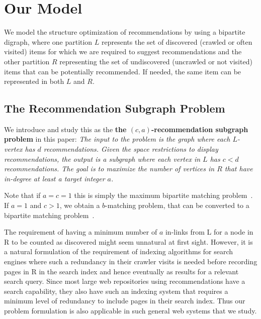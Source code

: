 \section{Our Model}

We model the structure optimization of recommendations by using a bipartite
digraph, where one partition $L$ represents the set of discovered (crawled or often visited) items for which
we are required to suggest recommendations and the other partition $R$
representing the set of undiscovered (uncrawled or not visited) items that can be potentially recommended. If
needed, the same item can be represented in both $L$ and $R$.
\vs

\subsection{The Recommendation Subgraph Problem}
We introduce and study this as the {\bf the $(c, a)$-recommendation subgraph problem} in this paper:
{\em
 The input to the problem is the graph where each
$L$-vertex has $d$ recommendations. Given the space restrictions to
display recommendations, the output is a subgraph where each vertex in
$L$ has $c < d$ recommendations. The goal is to maximize the number of
vertices in $R$ that have in-degree at least a target integer $a$.
}

\vs

Note that if $a=c=1$ this is simply the maximum bipartite
matching problem~\cite{LovaszPlummer1986}. If $a=1$ and $c > 1$, we
obtain a $b$-matching problem, that can be converted to a bipartite
matching problem~\cite{Gabow1983}.\vs

The requirement of having a minimum number of $a$ in-links from L for a node in R to be counted as discovered might seem unnatural at first sight. However, it is a natural formulation of the requirement of indexing algorithms for search engines where such a redundancy in their crawler visits is needed before recording pages in R in the search index and hence eventually as results for a relevant search query. Since most large web repositories using recommendations have a search capability, they also have such an indexing system that requires a minimum level of redundancy to include pages in their search index. Thus our problem formulation is also applicable in such general web systems that we study.

